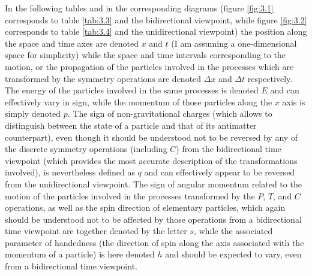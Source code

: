 \documentclass[notitlepage,12pt]{report}
\begin{document}
In the following tables and in the corresponding diagrams (figure \ref{fig:3.1} corresponds to table \ref{tab:3.3} and the bidirectional viewpoint, while figure \ref{fig:3.2} corresponds to table \ref{tab:3.4} and the unidirectional viewpoint) the position along the space and time axes are denoted $x$ and $t$ (I am assuming a one-dimensional space for simplicity) while the space and time intervals corresponding to the motion, or the propagation of the particles involved in the processes which are transformed by the symmetry operations are denoted $\Delta x$ and $\Delta t$ respectively. The energy of the particles involved in the same processes is denoted $E$ and can effectively vary in sign, while the momentum of those particles along the $x$ axis is simply denoted $p$. The sign of non-gravitational charges (which allows to distinguish between the state of a particle and that of its antimatter counterpart), even though it should be understood not to be reversed by any of the discrete symmetry operations (including $C$) from the bidirectional time viewpoint (which provides the most accurate description of the transformations involved), is nevertheless defined as $q$ and can effectively appear to be reversed from the unidirectional viewpoint. The sign of angular momentum related to the motion of the particles involved in the processes transformed by the $P$, $T$, and $C$ operations, as well as the spin direction of elementary particles, which again should be understood not to be affected by those operations from a bidirectional time viewpoint are together denoted by the letter $s$, while the associated parameter of handedness (the direction of spin along the axis associated with the momentum of a particle) is here denoted $h$ and should be expected to vary, even from a bidirectional time viewpoint.
\end{document}
